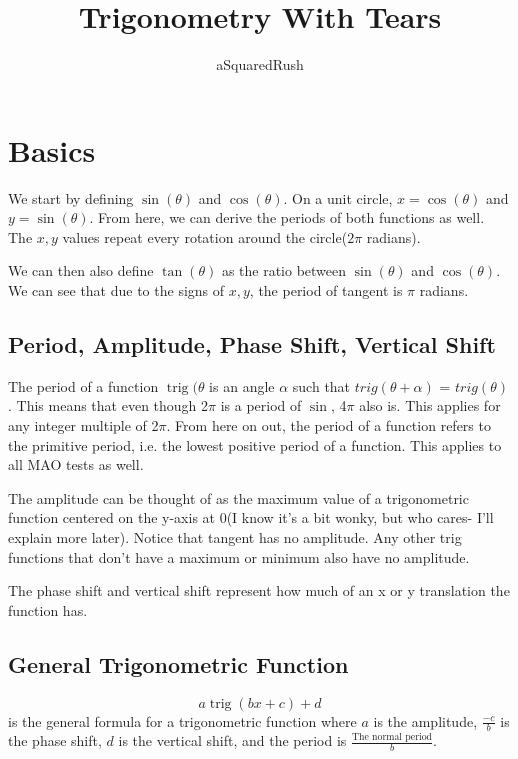 \documentclass{article}
\title{Trigonometry With Tears}
\author{aSquaredRush}
\date{}
\DeclareMathOperator{\trig}{trig}
\begin{document}
\maketitle
\tableofcontents
\newpage



\section{Basics}
\noindent We start by defining $\sin(\theta)$ and $\cos(\theta)$. On a unit circle, $x=\cos(\theta)$ and $y=\sin(\theta)$. From here, we can derive the periods of both functions as well. The $x,y$ values repeat every rotation around the circle($2\pi$ radians). 
\vspace{5mm}

\noindent We can then also define $\tan(\theta)$ as the ratio between $\sin(\theta)$ and $\cos(\theta)$. We can see that due to the signs of $x,y$, the period of tangent is $\pi$ radians. 

\vspace{5mm}

\subsection{Period, Amplitude, Phase Shift, Vertical Shift}
\noindent The period of a function $\trig(\theta$ is an angle $\alpha$ such that $trig(\theta+\alpha)$ = $trig(\theta)$. This means that even though 2$\pi$ is a period of $\sin$, 4$\pi$ also is. This applies for any integer multiple of 2$\pi$. From here on out, the period of a function refers to the primitive period, i.e. the lowest positive period of a function. This applies to all MAO tests as well.

\vspace{5mm}
\noindent The amplitude can be thought of as the maximum value of a trigonometric function centered on the y-axis at 0(I know it's a bit wonky, but who cares- I'll explain more later). Notice that tangent has no amplitude. Any other trig functions that don't have a maximum or minimum also have no amplitude.

\vspace{5mm}
\noindent The phase shift and vertical shift represent how much of an x or y translation the function has. 

\subsection{General Trigonometric Function}
$$a\trig{(bx+c)}+d$$ 
is the general formula for a trigonometric function where $a$ is the amplitude, $\frac{-c}{b}$ is the phase shift, $d$ is the vertical shift, and the period is $\frac{\textrm{The normal period}}{b}$. 
\end{document}

